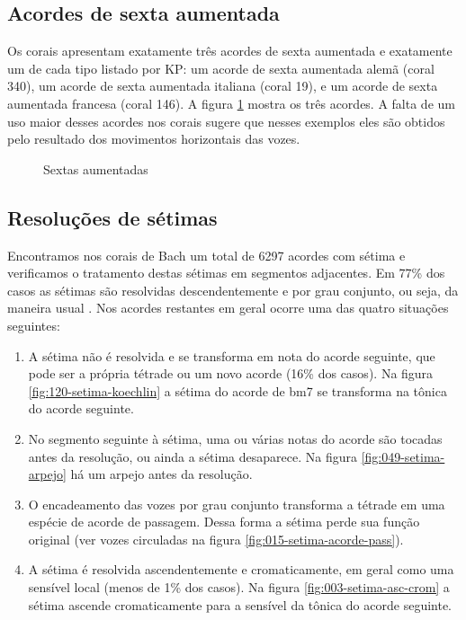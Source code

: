 \subsection{Acordes de sexta aumentada}
\label{sec:acordes-de-sexta}

Os corais apresentam exatamente três acordes de sexta aumentada e
exatamente um de cada tipo listado por KP: um acorde de sexta
aumentada alemã (coral 340), um acorde de sexta aumentada italiana
(coral 19), e um acorde de sexta aumentada francesa (coral 146). A
figura \ref{fig:sextas-aumentadas} mostra os três acordes. A falta de
um uso maior desses acordes nos corais sugere que nesses exemplos eles
são obtidos pelo resultado dos movimentos horizontais das vozes.

\begin{figure}
  \centering
  \caption{Sextas aumentadas}
  \label{fig:sextas-aumentadas}
\end{figure}

\subsection{Resoluções de sétimas}
\label{sec:setimas}

Encontramos nos corais de Bach um total de 6297 acordes com sétima e
verificamos o tratamento destas sétimas em segmentos adjacentes. Em
77\% dos casos as sétimas são resolvidas descendentemente e por grau
conjunto, ou seja, da maneira usual \cite[p. 207]{kostka.ea00:tonal}.
Nos acordes restantes em geral ocorre uma das quatro situações
seguintes:

\begin{enumerate}
\item A sétima não é resolvida e se transforma em nota do acorde
  seguinte, que pode ser a própria tétrade ou um novo acorde (16\% dos
  casos). Na figura \ref{fig:120-setima-koechlin} a sétima do acorde
  de bm7 se transforma na tônica do acorde seguinte.
\item No segmento seguinte à sétima, uma ou várias notas do acorde são
  tocadas antes da resolução, ou ainda a sétima desaparece. Na figura
  \ref{fig:049-setima-arpejo} há um arpejo antes da resolução.
\item O encadeamento das vozes por grau conjunto transforma a tétrade
  em uma espécie de acorde de passagem. Dessa forma a sétima perde sua
  função original (ver vozes circuladas na figura
  \ref{fig:015-setima-acorde-pass}).
\item A sétima é resolvida ascendentemente e cromaticamente, em geral
  como uma sensível local (menos de 1\% dos casos). Na figura
  \ref{fig:003-setima-asc-crom} a sétima ascende cromaticamente para a
  sensível da tônica do acorde seguinte.
\end{enumerate}

